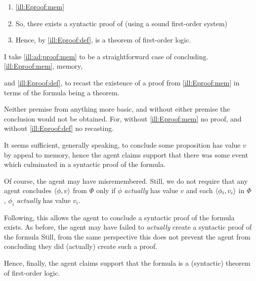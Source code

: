 \begin{note}
  \begin{illustration}[\adA{}]
    \label{ill:ad:proof:mem}
    \mbox{}
    \vspace{-\baselineskip}
    \begin{enumerate}[%
      label=\arabic*,%
      ref=({I}.{\ref{ill:ad:proof:mem}}:\arabic*)%
      ]
    \item \illEproofMem{} \hfill \ref{ill:Eproof:mem}
    \item
      \label{ill:Eproof:exP}
      So, there exists a syntactic proof of  (using a sound first-order system)
    \item
      \label{ill:Eproof:thm}
      Hence, by \ref{ill:Eproof:def},  is a theorem of first-order logic.
    \end{enumerate}
    \vspace{-\baselineskip}
  \end{illustration}
\end{note}

\begin{note}
  I take \autoref{ill:ad:proof:mem} to be a straightforward case of concluding.
  \ref{ill:Eproof:mem}, memory,


  and \ref{ill:Eproof:def}, to recast the existence of a proof from \ref{ill:Eproof:mem} in terms of the formula being a theorem.

  Neither premise from anything more basic, and without either premise the conclusion would not be obtained.
  For, without \ref{ill:Eproof:mem} no proof, and without \ref{ill:Eproof:def} no recasting.
\end{note}

\begin{note}
  It seems sufficient, generally speaking, to conclude some proposition has value \(v\) by appeal to memory, hence the agent claims support that there was some event which culminated in a syntactic proof of the formula.

  Of course, the agent may have misremembered.
  Still, we do not require that any agent concludes \(\langle \phi, v \rangle\) from \(\Phi\) only if \(\phi\) \emph{actually} has value \(v\) and each \(\langle \phi_{i}, v_{i} \rangle\) in \(\Phi\), \(\phi_{i}\) \emph{actually} has value \(v_{i}\).

  Following, this allows the agent to conclude a syntactic proof of the formula exists.
  As before, the agent may have failed to \emph{actually} create a syntactic proof of the formula
  Still, from the same perspective this does not prevent the agent from concluding they did (actually) create such a proof.

  Hence, finally, the agent claims support that the formula is a (syntactic) theorem of first-order logic.
\end{note}

